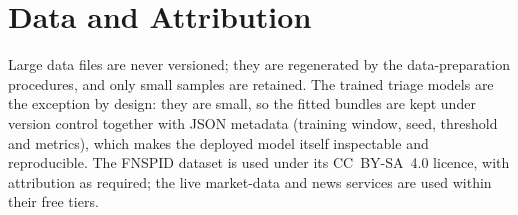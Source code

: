 \section{Data and Attribution}
\label{app:repro_data}

Large data files are never versioned; they are regenerated by the data-preparation procedures, and only small samples
are retained. The trained triage models are the exception by design: they are small, so the fitted
bundles are kept under version control together with JSON metadata (training window, seed, threshold
and metrics), which makes the deployed model itself inspectable and reproducible. The FNSPID dataset \autocite{dong2024fnspid} is used under its CC~BY-SA~4.0 licence, with
attribution as required; the live market-data and news services are used within their free tiers.
